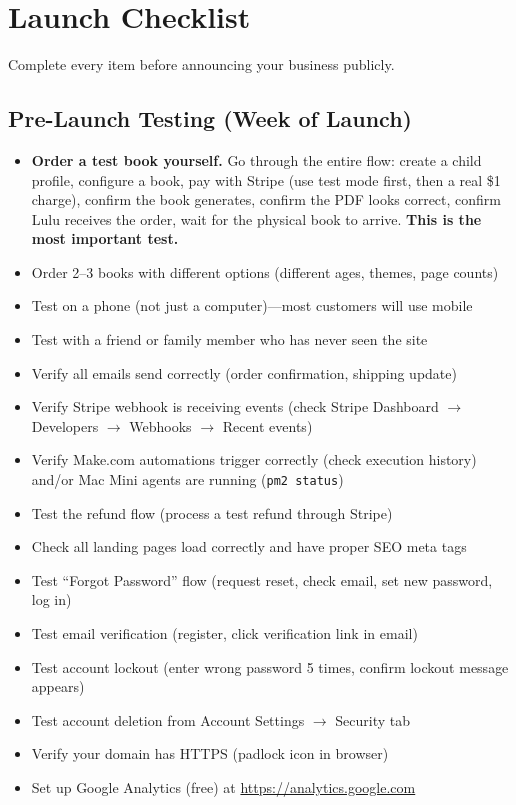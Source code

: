 \documentclass[12pt, letterpaper, oneside]{book}
\begin{document}
\chapter{Launch Checklist}

Complete every item before announcing your business publicly.

\section{Pre-Launch Testing (Week of Launch)}

\begin{itemize}[leftmargin=2em, itemsep=4pt]
  \item[$\square$] \textbf{Order a test book yourself.} Go through the entire flow: create a child profile, configure a book, pay with Stripe (use test mode first, then a real \$1 charge), confirm the book generates, confirm the PDF looks correct, confirm Lulu receives the order, wait for the physical book to arrive. \textbf{This is the most important test.}
  \item[$\square$] Order 2--3 books with different options (different ages, themes, page counts)
  \item[$\square$] Test on a phone (not just a computer)---most customers will use mobile
  \item[$\square$] Test with a friend or family member who has never seen the site
  \item[$\square$] Verify all emails send correctly (order confirmation, shipping update)
  \item[$\square$] Verify Stripe webhook is receiving events (check Stripe Dashboard $\rightarrow$ Developers $\rightarrow$ Webhooks $\rightarrow$ Recent events)
  \item[$\square$] Verify Make.com automations trigger correctly (check execution history) and/or Mac Mini agents are running (\texttt{pm2 status})
  \item[$\square$] Test the refund flow (process a test refund through Stripe)
  \item[$\square$] Check all landing pages load correctly and have proper SEO meta tags
  \item[$\square$] Test ``Forgot Password'' flow (request reset, check email, set new password, log in)
  \item[$\square$] Test email verification (register, click verification link in email)
  \item[$\square$] Test account lockout (enter wrong password 5 times, confirm lockout message appears)
  \item[$\square$] Test account deletion from Account Settings $\rightarrow$ Security tab
  \item[$\square$] Verify your domain has HTTPS (padlock icon in browser)
  \item[$\square$] Set up Google Analytics (free) at \url{https://analytics.google.com}
\end{itemize}
\end{document}

